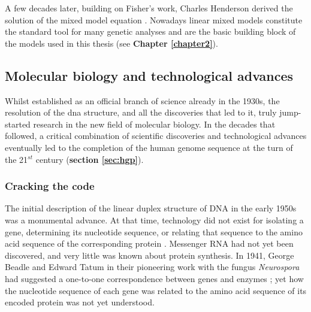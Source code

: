 A few decades later, building on Fisher’s work, Charles Henderson derived the solution of the mixed model equation \cite{henderson1950estimation}. 
Nowadays linear mixed models constitute the standard tool for many genetic analyses and are the basic building block of the models used in this thesis (see \textbf{Chapter
\ref{chapter2}}).

\newpage

\subsection{Molecular biology and technological advances}
\label{sec:genetic_timeline}

Whilst established as an official branch of science already in the 1930s, the resolution of the \gls{dna} structure, and all the discoveries that led to it, truly jump-started research in the new field of molecular biology.
In the decades that followed, a critical combination of scientific discoveries and technological advances eventually led to the completion of the human genome sequence at the turn of the 21$^{st}$ century \cite{nhgri2003genetic} (\textbf{section \ref{sec:hgp}}).

\subsubsection{Cracking the code}

The initial description of the linear duplex structure of DNA in the early 1950s was a monumental advance. 
At that time, technology did not exist for isolating a gene, determining its nucleotide sequence, or relating that sequence to the amino acid sequence of the corresponding protein \cite{yanofsky2007establishing}. 
Messenger RNA had not yet been discovered, and very little was known about protein synthesis. 
In 1941, George Beadle and Edward Tatum in their pioneering work with the fungus \textit{Neurospora} had suggested a one-to-one correspondence between genes and enzymes \cite{beadle1941genetic}; 
yet how the nucleotide sequence of each gene was related to the amino acid sequence of its encoded protein was not yet understood.\\

